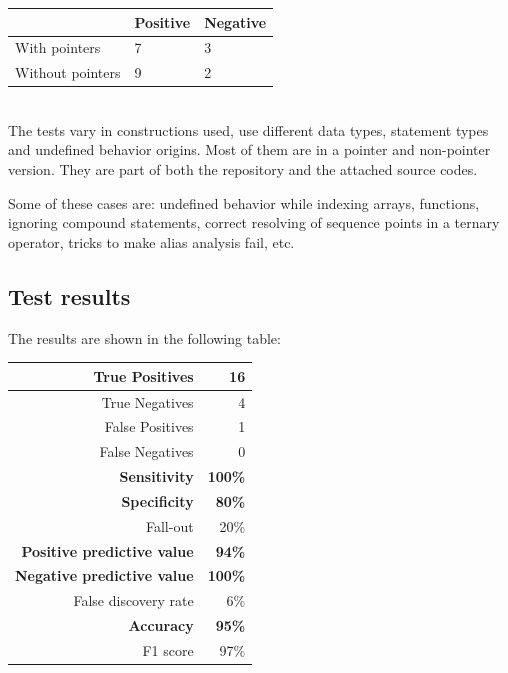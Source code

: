 \begin{tabular}{|l|l|l|}
\hline
                 & Positive & Negative \\\hline
With pointers    & 7        & 3        \\\hline
Without pointers & 9        & 2        \\\hline
\end{tabular}\\

The tests vary in constructions used, use different data types, statement types and undefined behavior origins. Most of them are in a pointer and non-pointer version. They are part of both the repository and the attached source codes.

Some of these cases are: undefined behavior while indexing arrays, functions, ignoring compound statements, correct resolving of sequence points in a ternary operator, tricks to make alias analysis fail, etc.

\subsection{Test results}

The results are shown in the following table:

\begin{tabular}{|r|r|}
\hline
True Positives                         &             16   \\\hline
True Negatives                         &              4   \\\hline
False Positives                        &              1   \\\hline
False Negatives                        &              0   \\\hline\hline
\textbf{Sensitivity}                   & \textbf{100\%}   \\\hline
\textbf{Specificity}                   &  \textbf{80\%}   \\\hline
Fall-out                               &           20\%   \\\hline
\textbf{Positive predictive value}     &  \textbf{94\%}   \\\hline
\textbf{Negative predictive value}     & \textbf{100\%}   \\\hline
False discovery rate                   &            6\%   \\\hline\hline
\textbf{Accuracy}                      &  \textbf{95\%}   \\\hline
F1 score                               &           97\%   \\\hline
\end{tabular}\\

